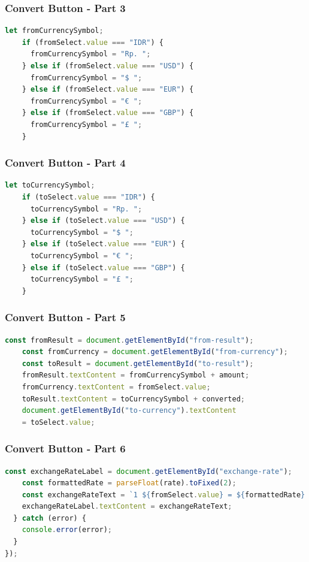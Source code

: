\documentclass[aspectratio=169, table]{beamer}
\begin{document}
\begin{frame}[fragile]
    \frametitle{Convert Button - Part 3}
    \begin{lstlisting}[language=JavaScript]
   let fromCurrencySymbol;
    if (fromSelect.value === "IDR") {
      fromCurrencySymbol = "Rp. ";
    } else if (fromSelect.value === "USD") {
      fromCurrencySymbol = "$ ";
    } else if (fromSelect.value === "EUR") {
      fromCurrencySymbol = "€ ";
    } else if (fromSelect.value === "GBP") {
      fromCurrencySymbol = "£ ";
    }
    \end{lstlisting}
\end{frame}

\begin{frame}[fragile]
    \frametitle{Convert Button - Part 4}
    \begin{lstlisting}[language=JavaScript]
   let toCurrencySymbol;
    if (toSelect.value === "IDR") {
      toCurrencySymbol = "Rp. ";
    } else if (toSelect.value === "USD") {
      toCurrencySymbol = "$ ";
    } else if (toSelect.value === "EUR") {
      toCurrencySymbol = "€ ";
    } else if (toSelect.value === "GBP") {
      toCurrencySymbol = "£ ";
    }
    \end{lstlisting}
\end{frame}

\begin{frame}[fragile]
    \frametitle{Convert Button - Part 5}
    \begin{lstlisting}[language=JavaScript]
    const fromResult = document.getElementById("from-result");
    const fromCurrency = document.getElementById("from-currency");
    const toResult = document.getElementById("to-result");
    fromResult.textContent = fromCurrencySymbol + amount;
    fromCurrency.textContent = fromSelect.value;
    toResult.textContent = toCurrencySymbol + converted;
    document.getElementById("to-currency").textContent
    = toSelect.value;
    \end{lstlisting}
\end{frame}

\begin{frame}[fragile]
    \frametitle{Convert Button - Part 6}
    \begin{lstlisting}[language=JavaScript]
    const exchangeRateLabel = document.getElementById("exchange-rate");
    const formattedRate = parseFloat(rate).toFixed(2);
    const exchangeRateText = `1 ${fromSelect.value} = ${formattedRate} ${toSelect.value}`;
    exchangeRateLabel.textContent = exchangeRateText;
  } catch (error) {
    console.error(error);
  }
});
    \end{lstlisting}
\end{frame}
\end{document}
